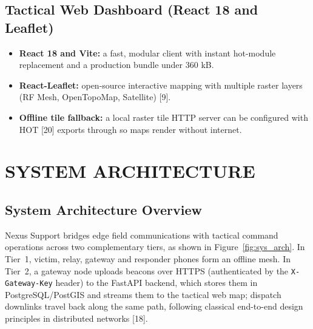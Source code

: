 \documentclass[12pt,a4paper]{report}
\begin{document}
\section{Tactical Web Dashboard (React 18 and Leaflet)}
\begin{itemize}
    \item \textbf{React 18 and Vite:} a fast, modular client with instant hot-module replacement and a production bundle under 360 kB.
    \item \textbf{React-Leaflet:} open-source interactive mapping with multiple raster layers (RF Mesh, OpenTopoMap, Satellite) [9].
    \item \textbf{Offline tile fallback:} a local raster tile HTTP server can be configured with HOT [20] exports through  so maps render without internet.
\end{itemize}

\chapter{SYSTEM ARCHITECTURE}

\section{System Architecture Overview}
Nexus Support bridges edge field communications with tactical command operations across two complementary tiers, as shown in Figure~\ref{fig:sys_arch}. In Tier~1, victim, relay, gateway and responder phones form an offline mesh. In Tier~2, a gateway node uploads beacons over HTTPS (authenticated by the \texttt{X-Gateway-Key} header) to the FastAPI backend, which stores them in PostgreSQL/PostGIS and streams them to the tactical web map; dispatch downlinks travel back along the same path, following classical end-to-end design principles in distributed networks [18].
\end{document}
